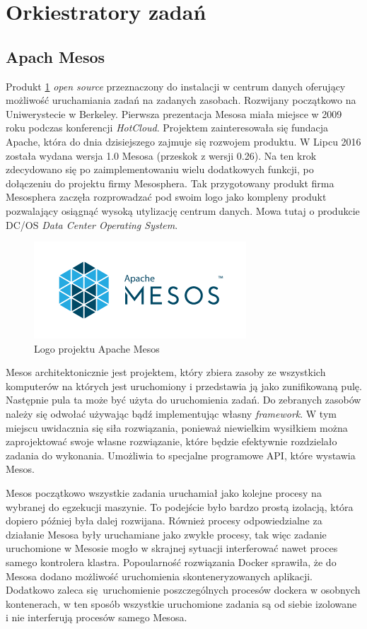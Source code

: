 \documentclass[10pt,a4paper,titlepage,twoside]{report}
\begin{document}
\newpage
\section{Orkiestratory zadań}

\subsection{Apach Mesos}

Produkt \ref{mesos_logo} \textit{open source} przeznaczony do instalacji w centrum danych oferujący możliwość uruchamiania zadań na zadanych zasobach. Rozwijany początkowo na Uniwerystecie w Berkeley. Pierwsza prezentacja Mesosa miała miejsce w 2009 roku podczas konferencji \textit{HotCloud}. Projektem zainteresowała się fundacja Apache, która do dnia dzisiejszego zajmuje się rozwojem produktu. W Lipcu 2016 została wydana wersja 1.0 Mesosa (przeskok z wersji 0.26). Na ten krok zdecydowano się po zaimplementowaniu wielu dodatkowych funkcji, po dołączeniu do projektu firmy Mesosphera. Tak przygotowany produkt firma Mesosphera zaczęła rozprowadzać pod swoim logo jako kompleny produkt pozwalający osiągnąć wysoką utylizację centrum danych. Mowa tutaj o produkcie DC/OS \textit{Data Center Operating System}. 

\begin{figure}[!h]
	\centering
	\includegraphics[scale=1]{pics/apache_mesos_logo.png}
	\caption{Logo projektu Apache Mesos}
	\label{mesos_logo}
\end{figure}

Mesos architektonicznie jest projektem, który zbiera zasoby ze wszystkich komputerów na których jest uruchomiony i przedstawia ją jako zunifikowaną pulę. Następnie pula ta może być użyta do uruchomienia zadań. Do zebranych zasobów należy się odwołać używając bądź implementując własny \textit{framework}. W tym miejscu uwidacznia się siła rozwiązania, ponieważ niewielkim wysiłkiem można zaprojektować swoje własne rozwiązanie, które będzie efektywnie rozdzielało zadania do wykonania. Umożliwia to specjalne programowe API, które wystawia Mesos.

Mesos początkowo wszystkie zadania uruchamiał jako kolejne procesy na wybranej do egzekucji maszynie. To podejście było bardzo prostą izolacją, która dopiero później była dalej rozwijana. Również procesy odpowiedzialne za działanie Mesosa były uruchamiane jako zwykłe procesy, tak więc zadanie uruchomione w Mesosie mogło w skrajnej sytuacji interferować nawet proces samego kontrolera klastra. Popoularność rozwiązania Docker sprawiła, że do Mesosa dodano możliwość uruchomienia skonteneryzowanych aplikacji. Dodatkowo zaleca się uruchomienie poszczególnych procesów dockera w osobnych kontenerach, w ten sposób wszystkie uruchomione zadania są od siebie izolowane i nie interferują procesów samego Mesosa.
\end{document}
